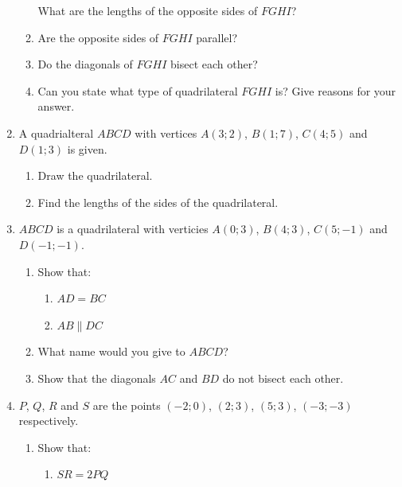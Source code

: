 \begin{enumerate}[noitemsep, label=\textbf{\arabic*}. ]
\begin{enumerate}[noitemsep, label=\textbf{\alph*}. ]
What are the lengths of the opposite sides of $FGHI$?
\label{m39167*uid48}\item Are the opposite sides of $FGHI$ parallel?
\label{m39167*uid49}\item  Do the diagonals of $FGHI$ bisect each other?
\label{m39167*uid50}\item  Can you state what type of quadrilateral $FGHI$ is? Give reasons for your answer.
\end{enumerate}
                \label{m39167*uid51}\item 
A quadrialteral $ABCD$ with vertices $A(3;2)$, $B(1;7)$, $C(4;5)$ and $D(1;3)$ is given.
\label{m39167*id69770}\begin{enumerate}[noitemsep, label=\textbf{\alph*}. ] 
            \label{m39167*uid52}\item  Draw the quadrilateral.
\label{m39167*uid53}\item  Find the lengths of the sides of the quadrilateral.
\end{enumerate}
                \label{m39167*uid54}\item $ABCD$ is a quadrilateral with verticies $A(0;3)$, $B(4;3)$, $C(5;-1)$ and $D(-1;-1)$.
\label{m39167*id69816}\begin{enumerate}[noitemsep, label=\textbf{\alph*}. ] 
            \label{m39167*uid55}\item Show that:
\label{m39167*id69834}\begin{enumerate}[noitemsep, label=\textbf{\roman*}. ] 
            \label{m39167*uid56}\item $AD = BC$
\label{m39167*uid57}\item $AB \parallel DC$
\end{enumerate}
        \label{m39167*uid58}\item What name would you give to $ABCD$?
\label{m39167*uid59}\item Show that the diagonals $AC$ and $BD$ do not bisect each other.
\end{enumerate}
                \label{m39167*uid60}\item $P$, $Q$, $R$ and $S$ are the points $(-2;0)$, $(2;3)$, $(5;3)$, $(-3;-3)$ respectively.
\label{m39167*id69919}\begin{enumerate}[noitemsep, label=\textbf{\alph*}. ] 
            \label{m39167*uid61}\item Show that:
\label{m39167*id69937}\begin{enumerate}[noitemsep, label=\textbf{\roman*}. ] 
            \label{m39167*uid62}\item $SR = 2PQ$

\end{enumerate}
\end{enumerate}
\end{enumerate}
